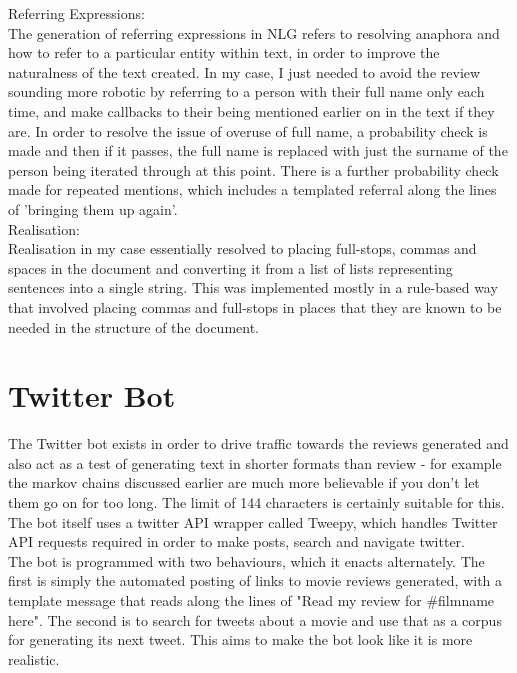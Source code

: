Referring Expressions:\\
The generation of referring expressions in NLG refers to resolving anaphora and how to refer to a particular entity within text, in order to improve the naturalness of the text created. In my case, I just needed to avoid the review sounding more robotic by referring to a person with their full name only each time, and make callbacks to their being mentioned earlier on in the text if they are. In order to resolve the issue of overuse of full name, a probability check is made and then if it passes, the full name is replaced with just the surname of the person being iterated through at this point. There is a further probability check made for repeated mentions, which includes a templated referral along the lines of 'bringing them up again'.\\



Realisation:\\
Realisation in my case essentially resolved to placing full-stops, commas and spaces in the document and converting it from a list of lists representing sentences into a single string. This was implemented mostly in a rule-based way that involved placing commas and full-stops in places that they are known to be needed in the structure of the document.\\


\section{Twitter Bot}
The Twitter bot exists in order to drive traffic towards the reviews generated and also act as a test of generating text in shorter formats than review - for example the markov chains discussed earlier are much more believable if you don't let them go on for too long. The limit of 144 characters is certainly suitable for this.\\
The bot itself uses a twitter API wrapper called Tweepy, which handles Twitter API requests required in order to make posts, search and navigate twitter.\\
The bot is programmed with two behaviours, which it enacts alternately. The first is simply the automated posting of links to movie reviews generated, with a template message that reads along the lines of "Read my review for \#filmname here". The second is to search for tweets about a movie and use that as a corpus for generating its next tweet. This aims to make the bot look like it is more realistic.\\



